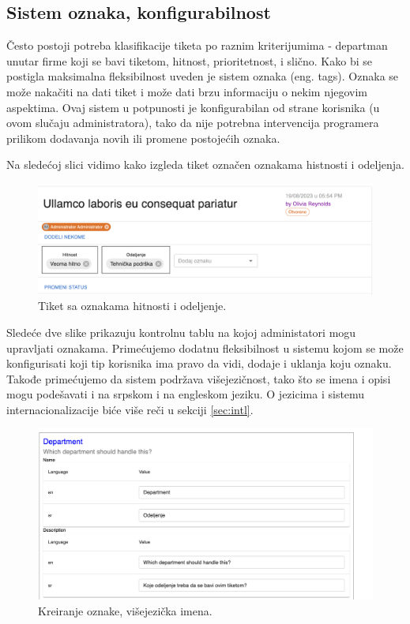 \documentclass[12pt,oneside]{memoir}
\begin{document}
\subsection{Sistem oznaka, konfigurabilnost}

Često postoji potreba klasifikacije tiketa po raznim kriterijumima - departman unutar firme koji se bavi tiketom, hitnost, prioritetnost, i slično. Kako bi se postigla maksimalna fleksibilnost uveden je sistem oznaka (eng. tags). Oznaka se može nakačiti na dati tiket i može dati brzu informaciju o nekim njegovim aspektima. Ovaj sistem u potpunosti je konfigurabilan od strane korisnika (u ovom slučaju administratora), tako da nije potrebna intervencija programera prilikom dodavanja novih ili promene postojećih oznaka.

Na sledećoj slici vidimo kako izgleda tiket označen oznakama histnosti i odeljenja.

\begin{figure}[h]
  \centering
  \includegraphics[width=1\textwidth]{docs/images/ch_1/tagged-ticket.png} 
  \caption{Tiket sa oznakama hitnosti i odeljenje.}
\end{figure}

Sledeće dve slike prikazuju kontrolnu tablu na kojoj administatori mogu upravljati oznakama. Primećujemo dodatnu fleksibilnost u sistemu kojom se može konfigurisati koji tip korisnika ima pravo da vidi, dodaje i uklanja koju oznaku. Takođe primećujemo da sistem podržava višejezičnost, tako što se imena i opisi mogu podešavati i na srpskom i na engleskom jeziku. O jezicima i sistemu internacionalizacije biće više reči u sekciji \ref{sec:intl}.

\begin{figure}[h]
  \centering
  \includegraphics[width=1\textwidth]{docs/images/ch_1/tag-mgmt-head.png} 
  \caption{Kreiranje oznake, višejezička imena.}
\end{figure}
\end{document}

